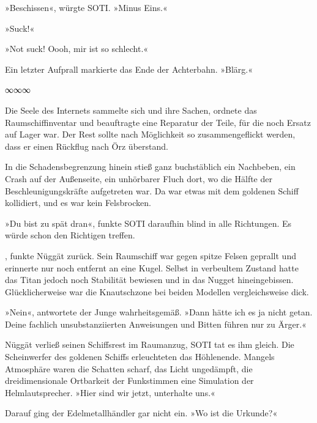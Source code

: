 »Beschissen«, würgte SOTI. »Minus Eins.«


»Suck!«


»Not suck! Oooh, mir ist so schlecht.«

Ein letzter Aufprall markierte das Ende der Achterbahn. »Blärg.«

\begin{center}
∞∞∞
\end{center}

Die Seele des Internets sammelte sich und ihre Sachen, ordnete das Raumschiffinventar und beauftragte eine Reparatur der Teile, für die noch Ersatz auf Lager war. Der Rest sollte nach Möglichkeit so zusammengeflickt werden, dass er einen Rückflug nach Örz überstand.

In die Schadensbegrenzung hinein stieß ganz buchstäblich ein Nachbeben, ein Crash auf der Außenseite, ein unhörbarer Fluch dort, wo die Hälfte der Beschleunigungskräfte aufgetreten war. Da war etwas mit dem goldenen Schiff kollidiert, und es war kein Felsbrocken.

»Du bist zu spät dran«, funkte SOTI daraufhin blind in alle Richtungen. Es würde schon den Richtigen treffen.

, funkte Nüggät zurück. Sein Raumschiff war gegen spitze Felsen geprallt und erinnerte nur noch entfernt an eine Kugel. Selbst in verbeultem Zustand hatte das Titan jedoch noch Stabilität bewiesen und in das Nugget hineingebissen. Glücklicherweise war die Knautschzone bei beiden Modellen vergleichsweise dick.

»Nein«, antwortete der Junge wahrheitsgemäß. »Dann hätte ich es ja nicht getan. Deine fachlich unsubstanziierten Anweisungen und Bitten führen nur zu Ärger.«


Nüggät verließ seinen Schiffsrest im Raumanzug, SOTI tat es ihm gleich. Die Scheinwerfer des goldenen Schiffs erleuchteten das Höhlenende. Mangels Atmosphäre waren die Schatten scharf, das Licht ungedämpft, die dreidimensionale Ortbarkeit der Funkstimmen eine Simulation der Helmlautsprecher. »Hier sind wir jetzt, unterhalte uns.«

Darauf ging der Edelmetallhändler gar nicht ein. »Wo ist die Urkunde?«

